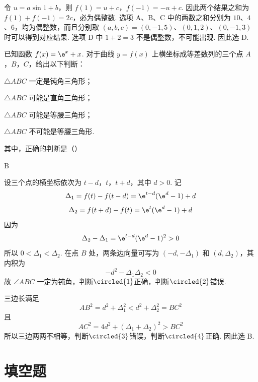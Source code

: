 \begin{solution}
令 \(u=a\sin1+b\)，则
\(f(1)=u+c\)，\(f(-1)=-u+c\).
因此两个结果之和为 \(f(1)+f(-1)=2c\)，必为偶整数. 选项 A、B、C 中的两数之和分别为 \(10\)、\(4\)、\(6\)，均为偶整数，而且分别取 \((a,b,c)=(0,-1,5)\)、\((0,1,2)\)、\((0,-1,3)\) 时可以得到对应结果. 选项 D 中 \(1+2=3\) 不是偶整数，不可能出现. 因此选 D.
\end{solution}

\begin{problem}
已知函数 \(f(x)=\e^{x}+x\). 对于曲线 \(y=f(x)\) 上横坐标成等差数列的三个点 \(A\)，\(B\)，\(C\)，给出以下判断：

\begin{circlelist}
\item \(\triangle ABC\) 一定是钝角三角形；
\item \(\triangle ABC\) 可能是直角三角形；
\item \(\triangle ABC\) 可能是等腰三角形；
\item \(\triangle ABC\) 不可能是等腰三角形.
\end{circlelist}

其中，正确的判断是（\quad）

\choices
    {}
    {}
    {}
    {}
\end{problem}

\begin{answer}
B
\end{answer}

\begin{solution}
设三个点的横坐标依次为 \(t-d\)，\(t\)，\(t+d\)，其中 \(d>0\). 记
\[
\Delta_1=f(t)-f(t-d)=\e^{t-d}(\e^d-1)+d
\]
\[
\Delta_2=f(t+d)-f(t)=\e^t(\e^d-1)+d
\]
因为
\[
\Delta_2-\Delta_1=\e^{t-d}(\e^d-1)^2>0
\]
所以 \(0<\Delta_1<\Delta_2\). 在点 \(B\) 处，两条边向量可写为 \((-d,-\Delta_1)\) 和 \((d,\Delta_2)\)，其内积为
\[
-d^2-\Delta_1\Delta_2<0
\]
故 \(\angle ABC\) 一定为钝角，判断\(\circled{1}\)正确，判断\(\circled{2}\)错误.

三边长满足
\[
AB^2=d^2+\Delta_1^2<d^2+\Delta_2^2=BC^2
\]
且
\[
AC^2=4d^2+(\Delta_1+\Delta_2)^2>BC^2
\]
所以三边两两不相等，判断\(\circled{3}\)错误，判断\(\circled{4}\)正确. 因此选 B.
\end{solution}

\section{填空题}

